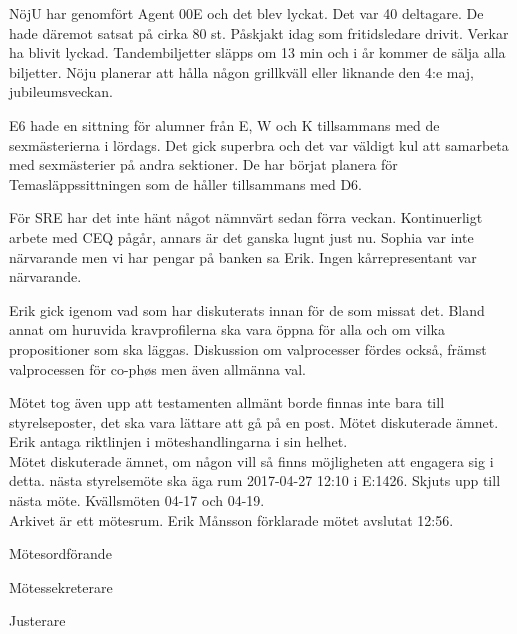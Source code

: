 \documentclass[10pt]{article}
\def\mo{Erik Månsson}
\def\ms{Johan Karlberg}
\def\ji{Josefine Sandström}
\begin{document}
\begin{paragrafer}
\begin{paragrafer}
NöjU har genomfört Agent 00E och det blev lyckat. Det var 40 deltagare. De hade däremot satsat på cirka 80 st. Påskjakt idag som fritidsledare drivit. Verkar ha blivit lyckad. Tandembiljetter släpps om 13 min och i år kommer de sälja alla biljetter. Nöju planerar att hålla någon grillkväll eller liknande den 4:e maj, jubileumsveckan.

E6 hade en sittning för alumner från E, W och K tillsammans med de sexmästerierna i lördags. Det gick superbra och det var väldigt kul att samarbeta med sexmästerier på andra sektioner. De har börjat planera för Temasläppssittningen som de håller tillsammans med D6.

För SRE har det inte hänt något nämnvärt sedan förra veckan. Kontinuerligt arbete med CEQ pågår, annars är det ganska lugnt just nu.
Sophia var inte närvarande men vi har pengar på banken sa Erik.
Ingen kårrepresentant var närvarande.
\end{paragrafer}

Erik gick igenom vad som har diskuterats innan för de som missat det. Bland annat om huruvida kravprofilerna ska vara öppna för alla och om vilka propositioner som ska läggas. Diskussion om valprocesser fördes också, främst valprocessen för co-phøs men även allmänna val.

Mötet tog även upp att testamenten allmänt borde finnas inte bara till styrelseposter, det ska vara lättare att gå på en post.
Mötet diskuterade ämnet.
Erik \ypa antaga riktlinjen i möteshandlingarna i sin helhet.\\
\Mbaby
{}
Mötet diskuterade ämnet, om någon vill så finns möjligheten att engagera sig i detta.
{\Mba} nästa styrelsemöte ska äga rum 2017-04-27 12:10 i E:1426.
Skjuts upp till nästa möte.
Kvällsmöten 04-17 och 04-19.\\
Arkivet är ett mötesrum.
{\mo} förklarade mötet avslutat 12:56.

\end{paragrafer}

\hidesignfoot
\begin{signatures}{3}
\signature{\mo}{Mötesordförande}
\signature{\ms}{Mötessekreterare}
\signature{\ji}{Justerare}
\end{signatures}
\end{document}
